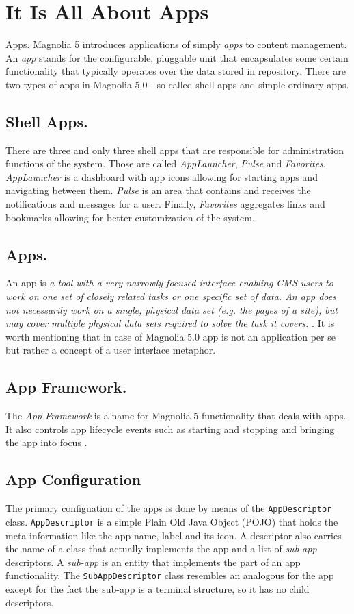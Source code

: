 \section{It Is All About Apps}
\label{section_apps}
Apps. Magnolia 5 introduces applications of simply \emph{apps} to content
management. An \emph{app} stands for the configurable, pluggable unit that
encapsulates some certain functionality that typically operates over the data
stored in repository.
There are two types of apps in Magnolia 5.0 - so called shell apps and simple
ordinary apps. 

\subsection{Shell Apps.} There are three and only three shell apps that are
responsible for administration functions of the system. Those are called
\emph{AppLauncher}, \emph{Pulse} and \emph{Favorites}. \emph{AppLauncher} is a
dashboard with app icons allowing for starting apps and navigating between them.
\emph{Pulse} is an area that contains and receives the notifications and messages for a
user. Finally, \emph{Favorites} aggregates links and bookmarks allowing for better
customization of the system.

\subsection{Apps.} An app is \emph{a tool with a very narrowly focused interface
enabling CMS users to work on one set of closely related tasks or one specific
set of data. An app does not necessarily work on a single, physical data set
(e.g. the pages of a site), but may cover multiple physical data sets required
to solve the task it covers.} \cite{maui_apps}. It is worth mentioning that in
case of Magnolia 5.0 app is not an application per se but rather a concept of a
user interface metaphor.

\subsection{App Framework.}
The \emph{App Framework} is a name for Magnolia 5 functionality
that deals with apps. It also controls app lifecycle events such as starting and
stopping and bringing the app into focus \cite{wiki_app_framework}.

\subsection{App Configuration}
The primary configuation of the apps is done by means of the
\texttt{AppDescriptor} class. \texttt{AppDescriptor} is a simple Plain Old Java
Object (POJO) that holds the meta information like the app name, label and its
icon. A descriptor also carries the name of a class that actually implements the
app and a list of \emph{sub-app} descriptors. A \emph{sub-app} is an entity that
implements the part of an app functionality. The \texttt{SubAppDescriptor} class
resembles an analogous for the app except for the fact the sub-app is a terminal
structure, so it has no child descriptors. 

